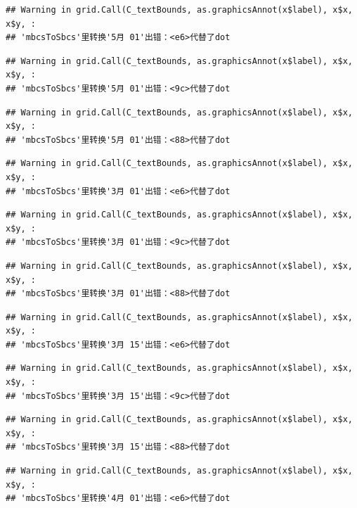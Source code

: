 \documentclass[
]{article}
\begin{document}
\begin{verbatim}
## Warning in grid.Call(C_textBounds, as.graphicsAnnot(x$label), x$x, x$y, :
## 'mbcsToSbcs'里转换'5月 01'出错：<e6>代替了dot
\end{verbatim}

\begin{verbatim}
## Warning in grid.Call(C_textBounds, as.graphicsAnnot(x$label), x$x, x$y, :
## 'mbcsToSbcs'里转换'5月 01'出错：<9c>代替了dot
\end{verbatim}

\begin{verbatim}
## Warning in grid.Call(C_textBounds, as.graphicsAnnot(x$label), x$x, x$y, :
## 'mbcsToSbcs'里转换'5月 01'出错：<88>代替了dot
\end{verbatim}

\begin{verbatim}
## Warning in grid.Call(C_textBounds, as.graphicsAnnot(x$label), x$x, x$y, :
## 'mbcsToSbcs'里转换'3月 01'出错：<e6>代替了dot
\end{verbatim}

\begin{verbatim}
## Warning in grid.Call(C_textBounds, as.graphicsAnnot(x$label), x$x, x$y, :
## 'mbcsToSbcs'里转换'3月 01'出错：<9c>代替了dot
\end{verbatim}

\begin{verbatim}
## Warning in grid.Call(C_textBounds, as.graphicsAnnot(x$label), x$x, x$y, :
## 'mbcsToSbcs'里转换'3月 01'出错：<88>代替了dot
\end{verbatim}

\begin{verbatim}
## Warning in grid.Call(C_textBounds, as.graphicsAnnot(x$label), x$x, x$y, :
## 'mbcsToSbcs'里转换'3月 15'出错：<e6>代替了dot
\end{verbatim}

\begin{verbatim}
## Warning in grid.Call(C_textBounds, as.graphicsAnnot(x$label), x$x, x$y, :
## 'mbcsToSbcs'里转换'3月 15'出错：<9c>代替了dot
\end{verbatim}

\begin{verbatim}
## Warning in grid.Call(C_textBounds, as.graphicsAnnot(x$label), x$x, x$y, :
## 'mbcsToSbcs'里转换'3月 15'出错：<88>代替了dot
\end{verbatim}

\begin{verbatim}
## Warning in grid.Call(C_textBounds, as.graphicsAnnot(x$label), x$x, x$y, :
## 'mbcsToSbcs'里转换'4月 01'出错：<e6>代替了dot
\end{verbatim}
\end{document}
